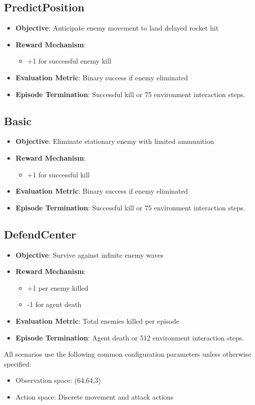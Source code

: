 \subsection{PredictPosition}
\begin{itemize}
\item \textbf{Objective}: Anticipate enemy movement to land delayed rocket hit
\item \textbf{Reward Mechanism}:
\begin{itemize}
\item +1 for successful enemy kill
\end{itemize}
\item \textbf{Evaluation Metric}: Binary success if enemy eliminated
\item \textbf{Episode Termination}: Successful kill or 75 environment interaction steps.
\end{itemize}

\subsection{Basic}
\begin{itemize}
\item \textbf{Objective}: Eliminate stationary enemy with limited ammunition
\item \textbf{Reward Mechanism}:
\begin{itemize}
\item +1 for successful kill
\end{itemize}
\item \textbf{Evaluation Metric}: Binary success if enemy eliminated
\item \textbf{Episode Termination}: Successful kill or 75 environment interaction steps.
\end{itemize}

\subsection{DefendCenter}
\begin{itemize}
\item \textbf{Objective}: Survive against infinite enemy waves
\item \textbf{Reward Mechanism}:
\begin{itemize}
\item +1 per enemy killed
\item -1 for agent death
\end{itemize}
\item \textbf{Evaluation Metric}: Total enemies killed per episode
\item \textbf{Episode Termination}: Agent death or 512 environment interaction steps.
\end{itemize}

All scenarios use the following common configuration parameters unless otherwise specified:
\begin{itemize}
\item Observation space: (64,64,3)
\item Action space: Discrete movement and attack actions
\end{itemize}